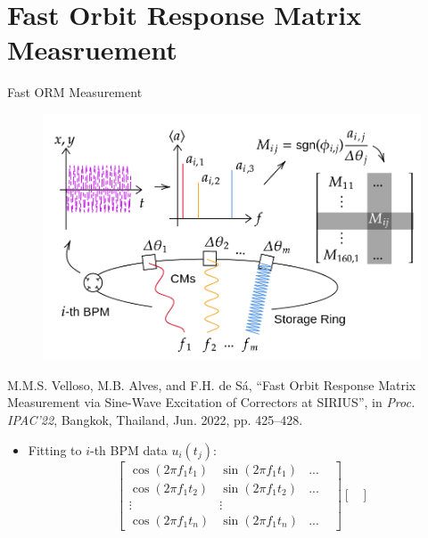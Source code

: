 \documentclass[aspectratio=169]{beamer}
\begin{document}
\section{Fast Orbit Response Matrix Measruement}
\begin{frame}{Fast ORM Measurement}
    \begin{minipage}{0.44\textwidth}
        \begin{figure}
            \centering
            \includegraphics[width=\textwidth]{MOPOTK002_f1.png}
        \end{figure}
        \tiny
        M.M.S. Velloso, M.B. Alves, and F.H. de Sá,
   \textquotedblleft{Fast Orbit Response Matrix Measurement via Sine-Wave Excitation of Correctors at SIRIUS}\textquotedblright, in \emph{Proc. IPAC'22}, Bangkok, Thailand, Jun. 2022, pp. 425--428.
    \end{minipage}
    \begin{minipage}{0.55\textwidth}
        \begin{itemize}
            \scriptsize
            \item Fitting to $i$-th BPM data $u_i(t_j)$:
                \begin{equation*}
                    \begin{bmatrix}
                        \cos (2\pi f_{1} t_{1}) & \sin( 2\pi f_{1} t_{1}) & ... &\\
                        \cos (2\pi f_{1} t_{2}) & \sin (2\pi f_{1} t_{2}) & ...& \\
                        \vdots  & \vdots  & & \\
                        \cos (2\pi f_{1} t_{n}) & \sin (2\pi f_{1} t_{n}) & ... &
                        \end{bmatrix}\begin{bmatrix}

\end{bmatrix}
\end{equation*}
\end{itemize}
\end{minipage}
\end{frame}
\end{document}
